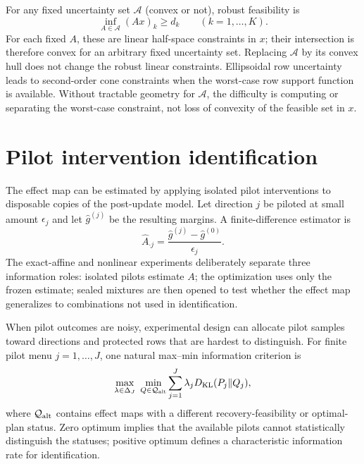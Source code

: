 \documentclass[11pt,letterpaper]{article}
\theoremstyle{plain}
\newcommand{\1}{\mathbf 1}
\begin{document}
For any fixed uncertainty set $\mathcal A$ (convex or not), robust feasibility is
\begin{equation}
 \inf_{A\in\mathcal A}(Ax)_k\ge d_k\qquad(k=1,\ldots,K).
\label{eq:s_robust_general}
\end{equation}
For each fixed $A$, these are linear half-space constraints in $x$; their intersection is therefore convex for an arbitrary fixed uncertainty set. Replacing $\mathcal A$ by its convex hull does not change the robust linear constraints. Ellipsoidal row uncertainty leads to second-order cone constraints when the worst-case row support function is available. Without tractable geometry for $\mathcal A$, the difficulty is computing or separating the worst-case constraint, not loss of convexity of the feasible set in $x$.

\section{Pilot intervention identification}
The effect map can be estimated by applying isolated pilot interventions to disposable copies of the post-update model. Let direction $j$ be piloted at small amount $\epsilon_j$ and let $\widehat g^{(j)}$ be the resulting margins. A finite-difference estimator is
\begin{equation}
 \widehat A_{\cdot j}=\frac{\widehat g^{(j)}-\widehat g^{(0)}}{\epsilon_j}.
\label{eq:s_fd_effect}
\end{equation}
The exact-affine and nonlinear experiments deliberately separate three information roles: isolated pilots estimate $A$; the optimization uses only the frozen estimate; sealed mixtures are then opened to test whether the effect map generalizes to combinations not used in identification.

When pilot outcomes are noisy, experimental design can allocate pilot samples toward directions and protected rows that are hardest to distinguish. For finite pilot menu $j=1,\ldots,J$, one natural max--min information criterion is
\begin{equation}
 \max_{\lambda\in\Delta_J}\ \min_{Q\in\mathcal Q_{\rm alt}}\sum_{j=1}^J\lambda_j D_{\mathrm{KL}}(P_j\|Q_j),
\label{eq:s_pilot_design}
\end{equation}
where $\mathcal Q_{\rm alt}$ contains effect maps with a different recovery-feasibility or optimal-plan status. Zero optimum implies that the available pilots cannot statistically distinguish the statuses; positive optimum defines a characteristic information rate for identification.
\end{document}

